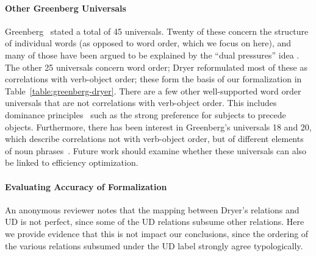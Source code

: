 \documentclass[10pt,twoside,lineno]{article}
\begin{document}


\paragraph{Other Greenberg Universals}
Greenberg~\cite{greenberg1963universals} stated a total of 45 universals.
Twenty of these concern the structure of individual words (as opposed to word order, which we focus on here), and many of those have been argued to be explained by the ``dual pressures'' idea \cite{haspelmath2006against}.
The other 25 universals concern word order; Dryer \cite{dryer1992greenbergian} reformulated most of these as correlations with verb-object order; these form the basis of our formalization in Table~\ref{table:greenberg-dryer}. 
There are a few other well-supported word order universals that are not correlations with verb-object order.
This includes dominance principles~\cite{greenberg1963universals,croft2003typology} such as the strong preference for subjects to precede objects.
Furthermore, there has been interest in Greenberg's universals 18 and 20, which describe correlations not with verb-object order, but of different elements of noun phrases~\cite{cinque2005deriving, culbertson2014language, dryer2018order}.
Future work should examine whether these universals can also be linked to efficiency optimization.


\paragraph{Evaluating Accuracy of Formalization}
An anonymous reviewer notes that the mapping between Dryer's relations and UD is not perfect, since some of the UD relations subsume other relations.
Here we provide evidence that this is not impact our conclusions, since the ordering of the various relations subsumed under the UD label strongly agree typologically.
\end{document}
